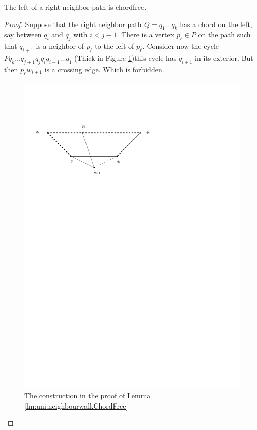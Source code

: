   \begin{lemma}
    \label{lm:uni:neighbourwalkChordFree}
    The left of a right neighbor path is chordfree.
  \end{lemma}
  \begin{proof}
    Suppose that the right neighbor path $Q = q_1 \ldots q_k$  has a chord on the left, say between $q_i$ and $q_j$ with $i< j -1 $. There is a vertex $p_\ell \in P$ on the path such that $q_{i+1}$ is a neighbor of $p_\ell$ to the left of $p_\ell$. Consider now the cycle $P q_k \ldots q_{j+1} q_j q_i q_{i-1} \ldots q_1$
    (Thick in Figure \ref{fig:uni:neihbourwalkChordFree})this cycle has $q_{i+1}$ in its exterior. But then $p_\ell w_{i+1}$ is a crossing edge. Which is forbidden.

    \begin{figure}[h]
      \centering
      \includegraphics[scale=1]{unifiedAlgo/img/neighbourWalkChords}
      \caption{The construction in the proof of Lemma \ref{lm:uni:neighbourwalkChordFree}}
      \label{fig:uni:neihbourwalkChordFree}
    \end{figure}
  \end{proof}
